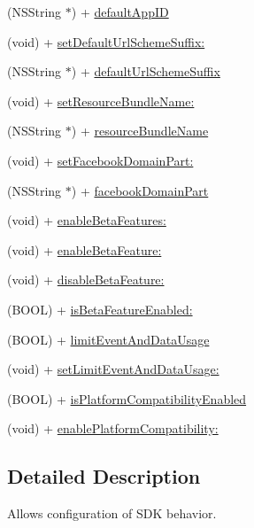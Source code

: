 \begin{DoxyCompactItemize}
\item 
(N\+S\+String $\ast$) + \hyperlink{interfaceFBSettings_af60cce044316df28d128d64e79a77ba5}{default\+App\+ID}
\item 
(void) + \hyperlink{interfaceFBSettings_a08a9504a71c1c9ec329e97da7c636337}{set\+Default\+Url\+Scheme\+Suffix\+:}
\item 
(N\+S\+String $\ast$) + \hyperlink{interfaceFBSettings_ae7709bddfea2d7cf28ad5e91f769dc9b}{default\+Url\+Scheme\+Suffix}
\item 
(void) + \hyperlink{interfaceFBSettings_a60a15470e22d07ad1c7d4a789712e3c1}{set\+Resource\+Bundle\+Name\+:}
\item 
(N\+S\+String $\ast$) + \hyperlink{interfaceFBSettings_ad87ff4e3c9577a22d9a329b12137f976}{resource\+Bundle\+Name}
\item 
(void) + \hyperlink{interfaceFBSettings_a4cfd61825c72f8a5978cb07ba84983d1}{set\+Facebook\+Domain\+Part\+:}
\item 
(N\+S\+String $\ast$) + \hyperlink{interfaceFBSettings_a7ce923f25dd500f81ce518e998bf2f39}{facebook\+Domain\+Part}
\item 
(void) + \hyperlink{interfaceFBSettings_a9ce6bc977fc54c59ba5cacf56922ccac}{enable\+Beta\+Features\+:}
\item 
(void) + \hyperlink{interfaceFBSettings_a390b436e1de87f3d49979a6aa98e14b1}{enable\+Beta\+Feature\+:}
\item 
(void) + \hyperlink{interfaceFBSettings_a6cc67de9d4b0069de4bfc6a3872f7114}{disable\+Beta\+Feature\+:}
\item 
(B\+O\+OL) + \hyperlink{interfaceFBSettings_a16d812cddbf44b8d354393d68757945f}{is\+Beta\+Feature\+Enabled\+:}
\item 
(B\+O\+OL) + \hyperlink{interfaceFBSettings_a3a939ba08bcff55d53c8e42f9a9e0234}{limit\+Event\+And\+Data\+Usage}
\item 
(void) + \hyperlink{interfaceFBSettings_ab0e8e19825a865db7cbf58da4957cf40}{set\+Limit\+Event\+And\+Data\+Usage\+:}
\item 
(B\+O\+OL) + \hyperlink{interfaceFBSettings_a257796e070b7f063dedaa95706946134}{is\+Platform\+Compatibility\+Enabled}
\item 
(void) + \hyperlink{interfaceFBSettings_a896c1bdd4227035fba49c90d06c101a2}{enable\+Platform\+Compatibility\+:}
\end{DoxyCompactItemize}


\subsection{Detailed Description}
Allows configuration of S\+DK behavior. 

